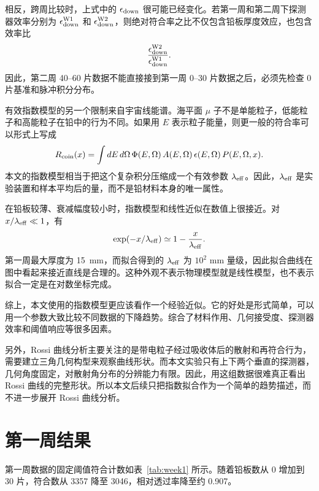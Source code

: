 \documentclass[aps,prl,twocolumn,superscriptaddress,nofootinbib]{revtex4-2}
\begin{document}
相反，跨周比较时，上式中的 $\epsilon_{\rm down}$ 很可能已经变化。若第一周和第二周下探测器效率分别为 $\epsilon_{\rm down}^{\rm W1}$ 和 $\epsilon_{\rm down}^{\rm W2}$，则绝对符合率之比不仅包含铅板厚度效应，也包含效率比
\begin{equation}
\frac{\epsilon_{\rm down}^{\rm W2}}{\epsilon_{\rm down}^{\rm W1}} .
\end{equation}
因此，第二周 40--60 片数据不能直接接到第一周 0--30 片数据之后，必须先检查 0 片基准和脉冲积分分布。

有效指数模型的另一个限制来自宇宙线能谱。海平面 $\mu$ 子不是单能粒子，低能粒子和高能粒子在铅中的行为不同。如果用 $E$ 表示粒子能量，则更一般的符合率可以形式上写成
\begin{equation}
R_{\rm coin}(x)=\int dE\, d\Omega\,
\Phi(E,\Omega)\, A(E,\Omega)\,
\epsilon(E,\Omega)\, P(E,\Omega,x).
\end{equation}
本文的指数模型相当于把这个复杂积分压缩成一个有效参数 $\lambda_{\rm eff}$。因此，$\lambda_{\rm eff}$ 是实验装置和样本平均后的量，而不是铅材料本身的唯一属性。

在铅板较薄、衰减幅度较小时，指数模型和线性近似在数值上很接近。对 $x/\lambda_{\rm eff}\ll1$，有
\begin{equation}
\exp(-x/\lambda_{\rm eff})
\simeq 1-\frac{x}{\lambda_{\rm eff}} .
\end{equation}
第一周最大厚度为 \SI{15}{mm}，而拟合得到的 $\lambda_{\rm eff}$ 为 $10^2$ mm 量级，因此拟合曲线在图中看起来接近直线是合理的。这种外观不表示物理模型就是线性模型，也不表示拟合一定是在对数坐标完成。

综上，本文使用的指数模型更应该看作一个经验近似。它的好处是形式简单，可以用一个参数大致比较不同数据的下降趋势。综合了材料作用、几何接受度、探测器效率和阈值响应等很多因素。

另外，Rossi 曲线分析主要关注的是带电粒子经过吸收体后的散射和再符合行为，需要建立三角几何构型来观察曲线形状。而本文实验只有上下两个垂直的探测器，几何角度固定，对散射角分布的分辨能力有限。因此，用这组数据很难真正看出 Rossi 曲线的完整形状。所以本文后续只把指数拟合作为一个简单的趋势描述，而不进一步展开 Rossi 曲线分析。


\section{第一周结果}

第一周数据的固定阈值符合计数如表~\ref{tab:week1} 所示。随着铅板数从 0 增加到 30 片，符合数从 3357 降至 3046，相对透过率降至约 0.907。
\end{document}
